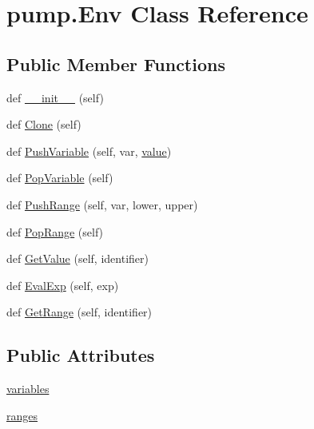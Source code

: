\hypertarget{classpump_1_1_env}{}\section{pump.\+Env Class Reference}
\label{classpump_1_1_env}
\subsection*{Public Member Functions}
\begin{DoxyCompactItemize}
\item 
def \mbox{\hyperlink{classpump_1_1_env_a803732618a49ab4a2edf098b78081611}{\+\_\+\+\_\+init\+\_\+\+\_\+}} (self)
\item 
def \mbox{\hyperlink{classpump_1_1_env_a4c1b156cfa4aec708746bbe07dae5f1a}{Clone}} (self)
\item 
def \mbox{\hyperlink{classpump_1_1_env_ae0abc25733c61a8cc010cc5d76dd0dd8}{Push\+Variable}} (self, var, \mbox{\hyperlink{_obj__test_2lib_2googletest-master_2googlemock_2test_2gmock-matchers__test_8cc_a337b8a670efc0b086ad3af163f3121b6}{value}})
\item 
def \mbox{\hyperlink{classpump_1_1_env_abf35f8b971acedb275bb92bb29fcd587}{Pop\+Variable}} (self)
\item 
def \mbox{\hyperlink{classpump_1_1_env_a600c34cac1e4ba75406efeadb2d7dd95}{Push\+Range}} (self, var, lower, upper)
\item 
def \mbox{\hyperlink{classpump_1_1_env_a45474355fc03b69e7449199cc8012ba9}{Pop\+Range}} (self)
\item 
def \mbox{\hyperlink{classpump_1_1_env_a43c3609179d5e458266731199e35313b}{Get\+Value}} (self, identifier)
\item 
def \mbox{\hyperlink{classpump_1_1_env_a29fa1ceb1f7c22e8e982133f4808317f}{Eval\+Exp}} (self, exp)
\item 
def \mbox{\hyperlink{classpump_1_1_env_a1df05a550bdcfe4bb8c5b1608484a6dc}{Get\+Range}} (self, identifier)
\end{DoxyCompactItemize}
\subsection*{Public Attributes}
\begin{DoxyCompactItemize}
\item 
\mbox{\hyperlink{classpump_1_1_env_aba6456f3d0d23ac92bc9508c1b966bcd}{variables}}
\item 
\mbox{\hyperlink{classpump_1_1_env_a8d5fec087c1a9108de9b105922b34309}{ranges}}
\end{DoxyCompactItemize}


